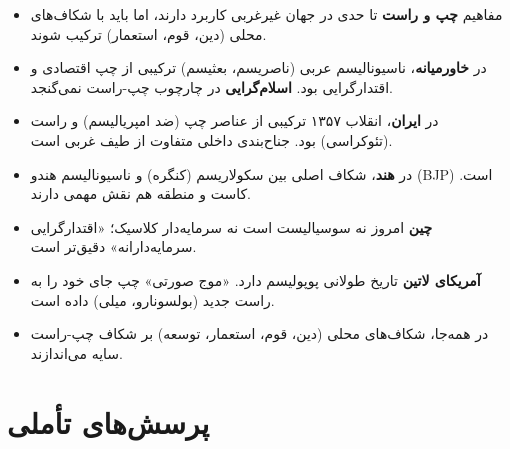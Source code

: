 \begin{summarybox}
\begin{itemize}
    \item مفاهیم \textbf{چپ و راست} تا حدی در جهان غیرغربی کاربرد دارند، اما باید با شکاف‌های محلی (دین، قوم، استعمار) ترکیب شوند.
    
    \item در \textbf{خاورمیانه}، ناسیونالیسم عربی (ناصریسم، بعثیسم) ترکیبی از چپ اقتصادی و اقتدارگرایی بود. \textbf{اسلام‌گرایی} در چارچوب چپ-راست نمی‌گنجد.
    
    \item در \textbf{ایران}، انقلاب ۱۳۵۷ ترکیبی از عناصر چپ (ضد امپریالیسم) و راست (تئوکراسی) بود. جناح‌بندی داخلی متفاوت از طیف غربی است.
    
    \item در \textbf{هند}، شکاف اصلی بین سکولاریسم (کنگره) و ناسیونالیسم هندو (BJP) است. کاست و منطقه هم نقش مهمی دارند.
    
    \item \textbf{چین} امروز نه سوسیالیست است نه سرمایه‌دار کلاسیک؛ «اقتدارگرایی سرمایه‌دارانه» دقیق‌تر است.
    
    \item \textbf{آمریکای لاتین} تاریخ طولانی پوپولیسم دارد. «موج صورتی» چپ جای خود را به راست جدید (بولسونارو، میلی) داده است.
    
    \item در همه‌جا، شکاف‌های محلی (دین، قوم، استعمار، توسعه) بر شکاف چپ-راست سایه می‌اندازند.
\end{itemize}
\end{summarybox}

\section*{پرسش‌های تأملی}

